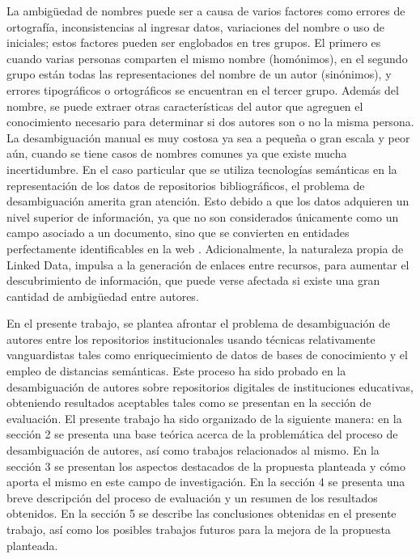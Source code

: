 \documentclass[conference]{IEEEtran}
\begin{document}
La ambigüedad de nombres puede ser a causa de varios factores como errores de ortografía, inconsistencias al ingresar datos, variaciones del nombre o uso de iniciales; estos factores pueden ser englobados en tres grupos. El primero es cuando varias personas comparten el mismo nombre (homónimos), en el segundo grupo están todas las representaciones del nombre de un autor (sinónimos), y errores tipográficos o ortográficos se encuentran en el tercer grupo. Además del nombre, se puede extraer  otras características del autor que agreguen el conocimiento necesario para determinar si dos autores son o no la misma persona. La desambiguación manual es muy costosa ya sea a pequeña o gran escala y  peor aún, cuando se tiene casos de nombres comunes ya que existe mucha incertidumbre. En el caso particular que se utiliza tecnologías semánticas en la representación de los  datos de repositorios bibliográficos, el problema de desambiguación amerita gran atención. Esto debido a que los datos  adquieren un nivel superior de información, ya que no son considerados únicamente como un campo asociado a un documento, sino que se convierten en entidades perfectamente  identificables en la web \cite{bizer2009linked}. Adicionalmente, la naturaleza propia de Linked Data, impulsa a la generación de enlaces entre recursos, para aumentar el descubrimiento de información,   que puede verse afectada si existe una gran cantidad de ambigüedad  entre  autores.

En el presente trabajo, se plantea afrontar el problema de desambiguación de autores entre los repositorios institucionales usando técnicas relativamente vanguardistas tales como enriquecimiento de datos de bases de conocimiento y el empleo de  distancias semánticas. Este proceso ha sido probado en la desambiguación de autores sobre repositorios digitales de instituciones educativas, obteniendo resultados aceptables tales como se presentan en la sección de evaluación. El presente trabajo ha sido organizado de la siguiente manera: en la sección 2 se presenta una base teórica acerca de la problemática del proceso de desambiguación de autores, así como trabajos relacionados al mismo. En la sección 3 se presentan los aspectos destacados de la  propuesta planteada y cómo aporta el mismo en este campo de investigación. En la sección 4  se presenta una breve descripción del proceso de evaluación y un resumen de los resultados obtenidos. En la sección 5 se  describe las conclusiones obtenidas en el presente trabajo, así como los posibles trabajos futuros para la mejora de la propuesta planteada.
\end{document}
